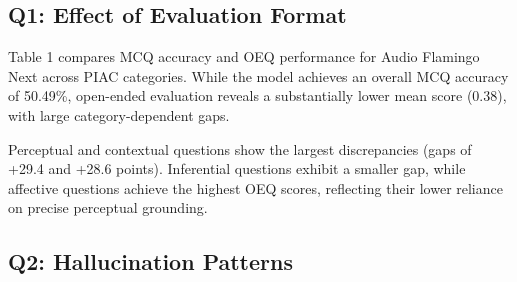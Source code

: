 \documentclass[conference,a4paper]{APSIPA2026}
\begin{document}
\begin{table}[t]
\centering
{}
\caption{Apparent versus actual musical understanding across PIAC categories for Audio Flamingo Next and Gemini. MCQ reflects multiple-choice accuracy, OEQ reflects open-ended correctness, and the gap denotes MCQ minus OEQ. Hallucination rates indicate the proportion of open-ended responses containing ungrounded or fabricated claims.}
\label{tab:piac-afnext-gemini}
\end{table}

\subsection{Q1: Effect of Evaluation Format}

Table 1 compares MCQ accuracy and OEQ performance for Audio Flamingo Next across PIAC categories. While the model achieves an overall MCQ accuracy of 50.49\%, open-ended evaluation reveals a substantially lower mean score (0.38), with large category-dependent gaps.

Perceptual and contextual questions show the largest discrepancies (gaps of +29.4 and +28.6 points). Inferential questions exhibit a smaller gap, while affective questions achieve the highest OEQ scores, reflecting their lower reliance on precise perceptual grounding.

\subsection{Q2: Hallucination Patterns}
\end{document}
